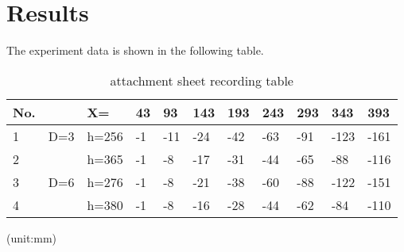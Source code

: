 \section{Results}
\label{sec:results}


The experiment data is shown in the following table.

\begin{table}[htb]
    \centering
    \begin{tabular}{l|l|l|llllllll}
    \hline
    No.&  & X=    & 43 & 93  & 143 & 193 & 243 & 293 & 343  & 393   \\ 
    \hline
    1 & D=3 & h=256 & -1 & -11 & -24 & -42 & -63 & -91 & -123 & -161  \\ 
    \cline{3-11}
    2 &    & h=365 & -1 & -8  & -17 & -31 & -44 & -65 & -88  & -116  \\ 
    \hline
    3 & D=6 & h=276 & -1 & -8  & -21 & -38 & -60 & -88 & -122 & -151  \\ 
    \cline{3-11}
    4 &    & h=380 & -1 & -8  & -16 & -28 & -44 & -62 & -84  & -110  \\
    \hline
    \end{tabular}

    (unit:mm)
    \caption{attachment sheet recording table}
    \label{t1} 
\end{table}


